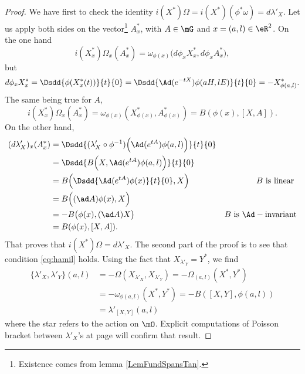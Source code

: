 \begin{proof}
We have first to check the identity $i(X^*)\Omega=i(X^*)(\phi^*\omega)=d\lambda'_X$. Let us apply both sides on the vector\footnote{Existence comes from lemma \ref{LemFundSpansTan}.} $A^*_x$, with $A\in\mG$ and $x=(a,l)\in\eR^2$. On the one hand
\[
  i(X^*_x)\Omega_x(A^*_x)=\omega_{\phi(x)}\big(   d\phi_xX^*_x,d\phi_xA^*_x   \big),
\]
but  
\begin{equation}
  d\phi_xX^*_x=\Dsdd{\phi(X^*_x(t))}{t}{0}
              =\Dsdd{ \Ad(e^{-tX})\phi(aH,lE) }{t}{0}
          =-X^*_{\phi(a,l)}.
\end{equation}
The same being true for $A$,
\[
  i(X^*_x)\Omega_x(A^*_x)=\omega_{\phi(x)}(X^*_{\phi(x)},A^*_{\phi(x)})=B(\phi(x),[X,A]).
\]
On the other hand,
\begin{equation}
\begin{aligned}
    (d\lambda'_X)_x(A^*_x)&=\Dsdd{ (\lambda'_X\circ\phi^{-1})\Big(   \Ad(e^{tA})\phi(a,l)   \Big) }{t}{0}\\
                         &=\Dsdd{  B\Big(X,\Ad(e^{tA})\phi(a,l) \Big)  }{t}{0} \\
                         &=B\Big(  \Dsdd{\Ad(e^{tA})\phi(x)}{t}{0},X   \Big)    & B\text{ is linear }\\
             &=B\Big(  (\ad A)\phi(x),X   \Big)\\
             &=-B\big(\phi(x),(\ad A)X\big) &   B\text{ is }\Ad-\text{invariant}   \\
             &=B(\phi(x),[X,A]).
\end{aligned}
\end{equation}
That proves that $i(X^*)\Omega=d\lambda'_X$.  The second part of the proof is to see that condition \eqref{eq:hamil} holds.  Using the fact that $X_{\lambda'_Y}=Y^*$, we find
\[ 
\begin{split}
  \{ \lambda'_X,\lambda'_Y \}(a,l)&=-\Omega(X_{\lambda'_X},X_{\lambda'_Y})
        =-\Omega_{(a,l)}(X^*,Y^*)\\
        &=-\omega_{\phi(a,l)}(X^*,Y^*)
        =-B([X,Y],\phi(a,l))\\
        &=\lambda'_{[X,Y]}(a,l)
\end{split}
\]
where the star refers to the action on $\mO$. Explicit computations of Poisson bracket between $\lambda'_X$'s at page \pageref{pg:explic_com_lamb} will confirm that result.

\end{proof}

